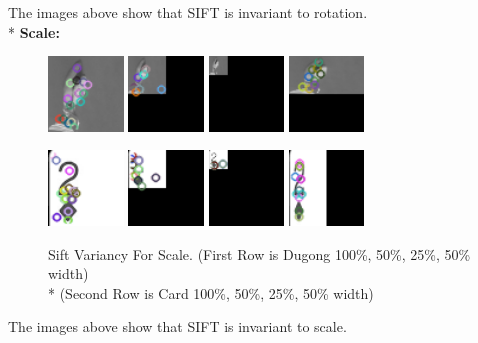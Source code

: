 \documentclass[conference]{IEEEtran}
\begin{document}
The images above show that SIFT is invariant to rotation.\\*
\textbf{Scale: }
\begin{figure}[H]
    \centerline{
        {\includegraphics[width=20mm, scale=0.5]{./figures/task 2/dugong-sift.png}}
        {\includegraphics[width=20mm, scale=0.5]{./figures/task 2/dugong50pc-sift.png}}
        {\includegraphics[width=20mm, scale=0.5]{./figures/task 2/dugong25pc-sift.png}}
        {\includegraphics[width=20mm, scale=0.5]{./figures/task 2/dugong50w-sift.png}}
    }
    \centerline{
        {\includegraphics[width=20mm, scale=0.5]{./figures/task 2/card-sift.png}}
        {\includegraphics[width=20mm, scale=0.5]{./figures/task 2/card50pc-sift.png}}
        {\includegraphics[width=20mm, scale=0.5]{./figures/task 2/card25pc-sift.png}}
        {\includegraphics[width=20mm, scale=0.5]{./figures/task 2/card50w-sift.png}}
    }
    \caption{Sift Variancy For Scale. (First Row is Dugong 100\%, 50\%, 25\%, 50\% width)\\*
    (Second Row is Card 100\%, 50\%, 25\%, 50\% width)}
    \label{fig}
\end{figure}
The images above show that SIFT is invariant to scale.
\end{document}
